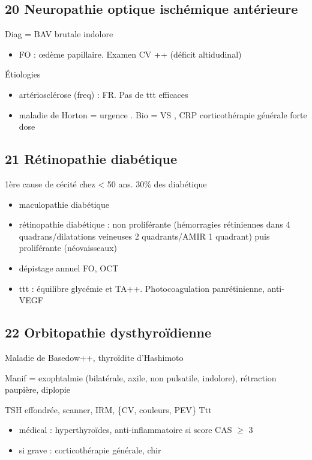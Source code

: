 \documentclass[11pt]{article}
\begin{document}
\subsection{20 Neuropathie optique ischémique antérieure}
\label{sec:orgdfcb5dd}
Diag = BAV brutale indolore
\begin{itemize}
\item FO : \oe{}dème papillaire. Examen CV ++ (déficit altidudinal)
\end{itemize}

Étiologies
\begin{itemize}
\item artériosclérose (freq) : FR. Pas de ttt efficaces
\item maladie de Horton = urgence . Bio = VS \inc, CRP \inc \thus
corticothérapie générale forte dose
\end{itemize}
\subsection{21 Rétinopathie diabétique}
\label{sec:org67bc131}
\label{orgc28cb24}
 1ère cause de cécité chez < 50 ans. 30\% des diabétique
\begin{itemize}
\item maculopathie diabétique
\item rétinopathie diabétique : non proliférante (hémorragies rétiniennes dans 4
quadrans/dilatations veineuses 2 quadrants/AMIR 1 quadrant) puis proliférante (néovaisseaux)
\item dépistage annuel FO, OCT
\item ttt : équilibre glycémie et TA++. Photocoagulation panrétinienne, anti-VEGF
\end{itemize}
\subsection{22 Orbitopathie dysthyroïdienne}
\label{sec:orgf52d2b2}
Maladie de Basedow++, thyroïdite d'Hashimoto

Manif = exophtalmie (bilatérale, axile, non pulsatile, indolore), rétraction
paupière, diplopie

TSH effondrée, scanner, IRM, \{CV, couleurs, PEV\}
Ttt 
\begin{itemize}
\item médical : hyperthyroïdes, anti-inflammatoire si score CAS \(\ge\) 3
\item si grave : corticothérapie générale, chir
\end{itemize}
\end{document}
